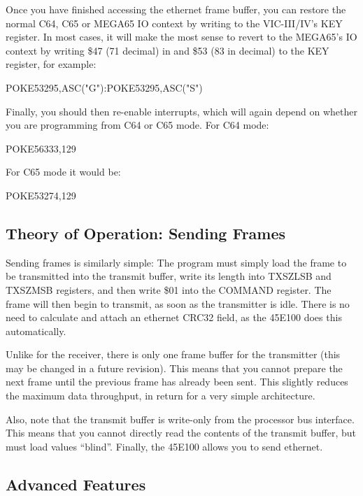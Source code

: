 Once you have finished accessing the ethernet frame buffer, you can restore the normal C64, C65 or MEGA65 IO context by writing to the VIC-III/IV's KEY register.  In most cases, it will make the most sense to revert to the MEGA65's IO context by writing \$47 (71 decimal) in and \$53 (83 in decimal) to the KEY register, for example:

\begin{screenoutput}
POKE53295,ASC("G"):POKE53295,ASC("S")
\end{screenoutput}

Finally, you should then re-enable interrupts, which will again depend on whether you are programming from C64 or C65 mode.  For C64 mode:

\begin{screenoutput}
POKE56333,129
\end{screenoutput}

For C65 mode it would be:

\begin{screenoutput}
POKE53274,129
\end{screenoutput}



\subsection{Theory of Operation: Sending Frames}

Sending frames is similarly simple: The program must simply load the frame to be transmitted into
the transmit buffer, write its length into TXSZLSB and TXSZMSB registers, and then write \$01 into
the COMMAND register.  The frame will then begin to transmit, as soon as the transmitter is idle.
There is no need to calculate and attach an ethernet CRC32 field, as the 45E100 does this automatically.

Unlike for the receiver, there is only one frame buffer for the transmitter (this may be changed in
a future revision). This means that you cannot prepare the next frame until the previous frame has
already been sent.  This slightly reduces the maximum data throughput, in return for a very simple
architecture.

Also, note that the transmit buffer is write-only from the processor bus interface. This means that
you cannot directly read the contents of the transmit buffer, but must load values ``blind''.  Finally,
the 45E100 allows you to send ethernet.

\subsection{Advanced Features}

